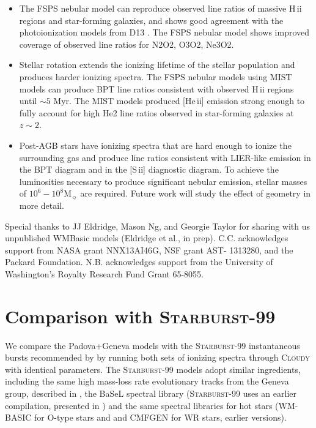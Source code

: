 \documentclass[linenumbers, tighten, trackchanges]{aastex61}%
\newcommand{\FSPS}{{\sc FSPS}\xspace}
\newcommand{\SB}{\textsc{Starburst-99}\xspace}
\newcommand{\Cloudy}{\textsc{Cloudy}\xspace}
\newcommand{\sii}{[S\,{\sc ii}]\xspace}
\newcommand{\heii}{[He\,{\sc ii}]\xspace}
\newcommand\Msun{\ensuremath{\mathrm{M_{\sun}}}}
\newcommand{\hii}{H\,{\sc ii}\xspace}
\begin{document}
\begin{itemize}
\item The \FSPS nebular model can reproduce observed line ratios of massive \hii regions and star-forming galaxies, and shows good agreement with the photoionization models from D13 . The FSPS nebular model shows improved coverage of observed line ratios for N2O2, O3O2, Ne3O2.
\item Stellar rotation extends the ionizing lifetime of the stellar population and produces harder ionizing spectra. The \FSPS nebular models using MIST models can produce BPT line ratios consistent with observed \hii regions until ${\sim}5$ Myr. The MIST models produced \heii emission strong enough to fully account for high He2 line ratios observed in star-forming galaxies at $z{\sim}2$.
\item Post-AGB stars have ionizing spectra that are hard enough to ionize the surrounding gas and produce line ratios consistent with LIER-like emission in the BPT diagram and in the \sii{} diagnostic diagram. To achieve the luminosities necessary to produce significant nebular emission, stellar masses of $10^6-10^8\Msun$ are required. Future work will study the effect of geometry in more detail.
\end{itemize}

\acknowledgments

Special thanks to JJ Eldridge, Mason Ng, and Georgie Taylor for sharing with us unpublished WMBasic models (Eldridge et al., in prep). C.C. acknowledges support from NASA grant NNX13AI46G, NSF grant AST- 1313280, and the Packard Foundation. N.B. acknowledges support from the University of Washington's Royalty Research Fund Grant 65-8055.


\newpage

\appendix

\section{Comparison with \SB}\label{sec:appendix:SB}

We compare the Padova+Geneva models with the \SB{} instantaneous bursts recommended by \citet{Levesque10} by running both sets of ionizing spectra through \Cloudy with identical parameters. The \SB{} models adopt similar ingredients, including the same high mass-loss rate evolutionary tracks from the Geneva group, described in \citet{Meynet00}, the BaSeL spectral library (\SB uses an earlier compilation, presented in \citet{Lejeune}) and the same spectral libraries for hot stars (WM-BASIC for O-type stars and and CMFGEN for WR stars, earlier versions).
\end{document}
